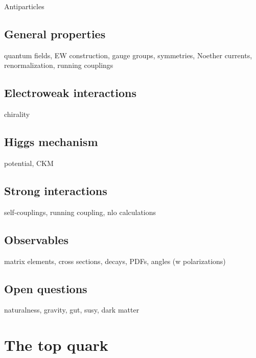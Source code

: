 

Antiparticles


\subsection{General properties}
quantum fields, EW construction, gauge groups, symmetries, Noether currents, renormalization, running couplings
\subsection{Electroweak interactions}
\label{sec:theory-ewk}
chirality
\subsection{Higgs mechanism}
potential, CKM
\subsection{Strong interactions}
\label{sec:theory-qcd}
self-couplings, running coupling, nlo calculations
\subsection{Observables}
matrix elements, cross sections, decays, PDFs, angles (w polarizations)
\subsection{Open questions}
naturalness, gravity, gut, susy, dark matter

\section{The top quark}
\subsection{}
